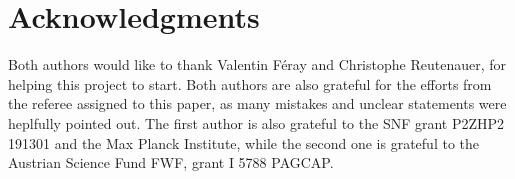 \documentclass[12pt, reqno]{amsart}
\theoremstyle{definition}
\begin{document}
\section*{Acknowledgments}

Both authors would like to thank Valentin F\'eray and Christophe Reutenauer, for helping this project to start.
Both authors are also grateful for the efforts from the referee assigned to this paper, as many mistakes and unclear statements were heplfully pointed out.
The first author is also grateful to the SNF grant P2ZHP2 191301 and the Max Planck Institute, while the second one is grateful to the Austrian Science Fund FWF, grant I 5788 PAGCAP.


%
%




\end{document}
